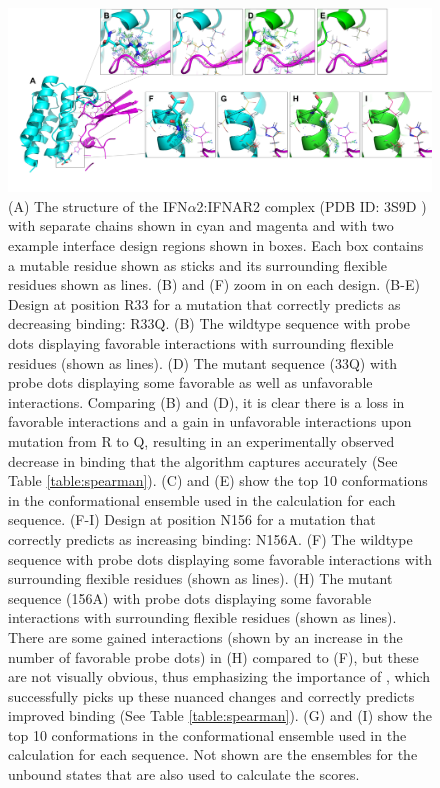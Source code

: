 \begin{figure}
 \center
 \includegraphics[width=\textwidth]{figures/designExamples.png}
 \vspace{-0.5in}%
 \caption{(A) The structure of the IFN$\alpha$2:IFNAR2 complex (PDB ID: 3S9D \cite{pdb3s9d}) with separate chains shown in cyan and magenta and with two example interface design regions shown in boxes. Each box contains a mutable residue shown as sticks and its surrounding flexible residues shown as lines. (B) and (F) zoom in on each design. (B-E) Design at position R33 for a mutation that \osprey correctly predicts as decreasing binding: R33Q. (B) The wildtype sequence with probe dots \cite{Probe,PIV} displaying favorable interactions with surrounding flexible residues (shown as lines). (D) The mutant sequence (33Q) with probe dots displaying some favorable as well as unfavorable interactions. Comparing (B) and (D), it is clear there is a loss in favorable interactions and a gain in unfavorable interactions upon mutation from R to Q, resulting in an experimentally observed decrease in binding that the \ks algorithm captures accurately (See Table \ref{table:spearman}). (C) and (E) show the top 10 conformations in the conformational ensemble used in the \ks calculation for each sequence. (F-I) Design at position N156 for a mutation that \osprey correctly predicts as increasing binding: N156A. (F) The wildtype sequence with probe dots displaying some favorable interactions with surrounding flexible residues (shown as lines). (H) The mutant sequence (156A) with probe dots displaying some favorable interactions with surrounding flexible residues (shown as lines). There are some gained interactions (shown by an increase in the number of favorable probe dots) in (H) compared to (F), but these are not visually obvious, thus emphasizing the importance of \ks, which successfully picks up these nuanced changes and correctly predicts improved binding (See Table \ref{table:spearman}). (G) and (I) show the top 10 conformations in the conformational ensemble used in the \ks calculation for each sequence. Not shown are the ensembles for the unbound states that are also used to calculate the \ks scores.}
\label{fig:designs}
\end{figure}

